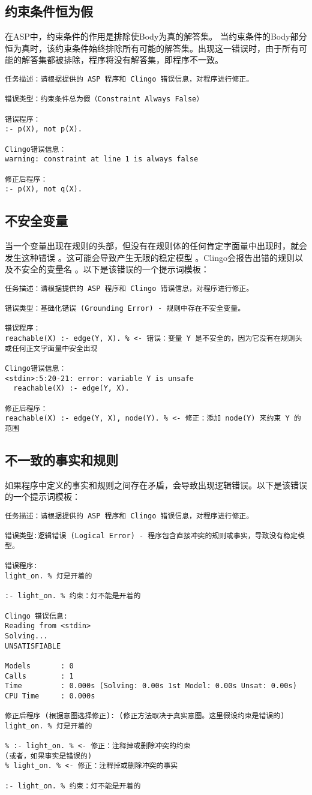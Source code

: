 \subsection{约束条件恒为假}
在ASP中，约束条件的作用是排除使Body为真的解答集。
当约束条件的Body部分恒为真时，该约束条件始终排除所有可能的解答集。出现这一错误时，由于所有可能的解答集都被排除，程序将没有解答集，即程序不一致。
\begin{lstlisting}
任务描述：请根据提供的 ASP 程序和 Clingo 错误信息，对程序进行修正。

错误类型：​约束条件总为假（Constraint Always False）

错误程序：
:- p(X), not p(X).

Clingo错误信息：
warning: constraint at line 1 is always false

修正后程序：
:- p(X), not q(X).
\end{lstlisting}
\subsection{不安全变量}
当一个变量出现在规则的头部，但没有在规则体的任何肯定字面量中出现时，就会发生这种错误 。这可能会导致产生无限的稳定模型 。Clingo会报告出错的规则以及不安全的变量名 。以下是该错误的一个提示词模板：
\begin{lstlisting}
任务描述：请根据提供的 ASP 程序和 Clingo 错误信息，对程序进行修正。

错误类型：基础化错误 (Grounding Error) - 规则中存在不安全变量。

错误程序：
reachable(X) :- edge(Y, X). % <- 错误：变量 Y 是不安全的，因为它没有在规则头或任何正文字面量中安全出现

Clingo错误信息：
<stdin>:5:20-21: error: variable Y is unsafe
  reachable(X) :- edge(Y, X).

修正后程序：
reachable(X) :- edge(Y, X), node(Y). % <- 修正：添加 node(Y) 来约束 Y 的范围
\end{lstlisting}
\subsection{不一致的事实和规则}
如果程序中定义的事实和规则之间存在矛盾，会导致出现逻辑错误。以下是该错误的一个提示词模板：
\begin{lstlisting}
任务描述：请根据提供的 ASP 程序和 Clingo 错误信息，对程序进行修正。

错误类型:逻辑错误 (Logical Error) - 程序包含直接冲突的规则或事实，导致没有稳定模型。

错误程序:
light_on. % 灯是开着的

:- light_on. % 约束：灯不能是开着的

Clingo 错误信息:
Reading from <stdin>
Solving...
UNSATISFIABLE

Models       : 0
Calls        : 1
Time         : 0.000s (Solving: 0.00s 1st Model: 0.00s Unsat: 0.00s)
CPU Time     : 0.000s

修正后程序 (根据意图选择修正): (修正方法取决于真实意图。这里假设约束是错误的)
light_on. % 灯是开着的

% :- light_on. % <- 修正：注释掉或删除冲突的约束
(或者，如果事实是错误的)
% light_on. % <- 修正：注释掉或删除冲突的事实

:- light_on. % 约束：灯不能是开着的
\end{lstlisting}
